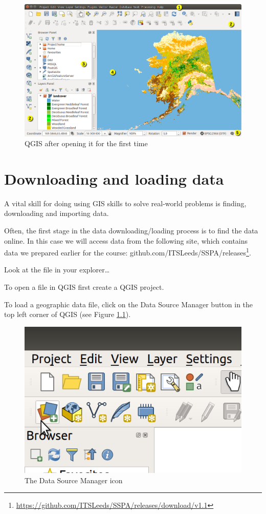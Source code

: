 \documentclass[10pt,a5paper,]{book}
\renewcommand{\href}[2]{#2\footnote{\url{#1}}}
\begin{document}
\begin{figure}
\includegraphics[width=1\linewidth]{figures/startup} \caption{QGIS after opening it for the first time}\label{fig:qgis-window}
\end{figure}

\hypertarget{data}{%
\chapter{Downloading and loading data}\label{data}}

A vital skill for doing using GIS skills to solve real-world problems is finding, downloading and importing data.

Often, the first stage in the data downloading/loading process is to find the data online.
In this case we will access data from the following site, which contains data we prepared earlier for the course: \href{https://github.com/ITSLeeds/SSPA/releases/download/v1.1}{github.com/ITSLeeds/SSPA/releases}.

Look at the file in your explorer\ldots{}

To open a file in QGIS first create a QGIS project.

To load a geographic data file, click on the Data Source Manager button in the top left corner of QGIS (see Figure \ref{fig:data-source-manager}).

\begin{figure}
\includegraphics[width=0.5\linewidth]{figures/open-data-source-manager} \caption{The Data Source Manager icon}\label{fig:data-source-manager}
\end{figure}
\end{document}
